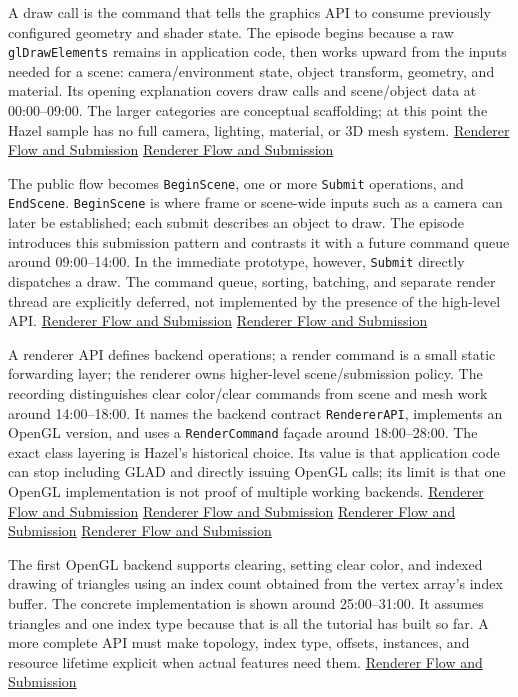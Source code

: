 A draw call is the command that tells the graphics API to consume previously configured geometry and shader state. The episode begins because a raw \texttt{glDrawElements} remains in application code, then works upward from the inputs needed for a scene: camera/environment state, object transform, geometry, and material. Its opening explanation covers draw calls and scene/object data at 00:00--09:00. The larger categories are conceptual scaffolding; at this point the Hazel sample has no full camera, lighting, material, or 3D mesh system. \href{https://www.youtube.com/watch?v=akxevYYWd9g&t=0s}{Renderer Flow and Submission} \href{https://www.youtube.com/watch?v=akxevYYWd9g&t=270s}{Renderer Flow and Submission}

The public flow becomes \texttt{BeginScene}, one or more \texttt{Submit} operations, and \texttt{EndScene}. \texttt{BeginScene} is where frame or scene-wide inputs such as a camera can later be established; each submit describes an object to draw. The episode introduces this submission pattern and contrasts it with a future command queue around 09:00--14:00. In the immediate prototype, however, \texttt{Submit} directly dispatches a draw. The command queue, sorting, batching, and separate render thread are explicitly deferred, not implemented by the presence of the high-level API. \href{https://www.youtube.com/watch?v=akxevYYWd9g&t=540s}{Renderer Flow and Submission} \href{https://www.youtube.com/watch?v=akxevYYWd9g&t=720s}{Renderer Flow and Submission}

A renderer API defines backend operations; a render command is a small static forwarding layer; the renderer owns higher-level scene/submission policy. The recording distinguishes clear color/clear commands from scene and mesh work around 14:00--18:00. It names the backend contract \texttt{RendererAPI}, implements an OpenGL version, and uses a \texttt{RenderCommand} façade around 18:00--28:00. The exact class layering is Hazel's historical choice. Its value is that application code can stop including GLAD and directly issuing OpenGL calls; its limit is that one OpenGL implementation is not proof of multiple working backends. \href{https://www.youtube.com/watch?v=akxevYYWd9g&t=840s}{Renderer Flow and Submission} \href{https://www.youtube.com/watch?v=akxevYYWd9g&t=1080s}{Renderer Flow and Submission} \href{https://www.youtube.com/watch?v=akxevYYWd9g&t=1380s}{Renderer Flow and Submission} \href{https://www.youtube.com/watch?v=akxevYYWd9g&t=1560s}{Renderer Flow and Submission}

The first OpenGL backend supports clearing, setting clear color, and indexed drawing of triangles using an index count obtained from the vertex array's index buffer. The concrete implementation is shown around 25:00--31:00. It assumes triangles and one index type because that is all the tutorial has built so far. A more complete API must make topology, index type, offsets, instances, and resource lifetime explicit when actual features need them. \href{https://www.youtube.com/watch?v=akxevYYWd9g&t=1500s}{Renderer Flow and Submission}

